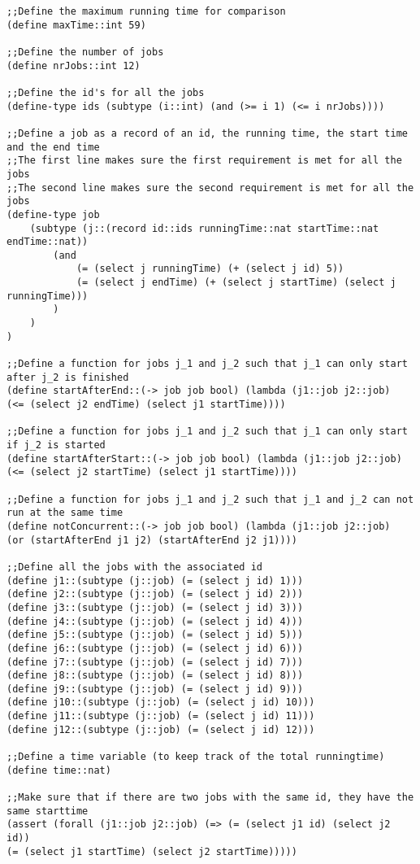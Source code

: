 \documentclass[12pt]{article}
\begin{document}
{\footnotesize
\begin{verbatim}
;;Define the maximum running time for comparison
(define maxTime::int 59)

;;Define the number of jobs
(define nrJobs::int 12)

;;Define the id's for all the jobs
(define-type ids (subtype (i::int) (and (>= i 1) (<= i nrJobs))))

;;Define a job as a record of an id, the running time, the start time and the end time
;;The first line makes sure the first requirement is met for all the jobs
;;The second line makes sure the second requirement is met for all the jobs
(define-type job 
	(subtype (j::(record id::ids runningTime::nat startTime::nat endTime::nat))
		(and 
			(= (select j runningTime) (+ (select j id) 5))
			(= (select j endTime) (+ (select j startTime) (select j runningTime)))
		)
	)
)

;;Define a function for jobs j_1 and j_2 such that j_1 can only start after j_2 is finished
(define startAfterEnd::(-> job job bool) (lambda (j1::job j2::job) 
(<= (select j2 endTime) (select j1 startTime))))

;;Define a function for jobs j_1 and j_2 such that j_1 can only start if j_2 is started
(define startAfterStart::(-> job job bool) (lambda (j1::job j2::job) 
(<= (select j2 startTime) (select j1 startTime))))

;;Define a function for jobs j_1 and j_2 such that j_1 and j_2 can not run at the same time
(define notConcurrent::(-> job job bool) (lambda (j1::job j2::job) 
(or (startAfterEnd j1 j2) (startAfterEnd j2 j1))))

;;Define all the jobs with the associated id
(define j1::(subtype (j::job) (= (select j id) 1)))
(define j2::(subtype (j::job) (= (select j id) 2)))
(define j3::(subtype (j::job) (= (select j id) 3)))
(define j4::(subtype (j::job) (= (select j id) 4)))
(define j5::(subtype (j::job) (= (select j id) 5)))
(define j6::(subtype (j::job) (= (select j id) 6)))
(define j7::(subtype (j::job) (= (select j id) 7)))
(define j8::(subtype (j::job) (= (select j id) 8)))
(define j9::(subtype (j::job) (= (select j id) 9)))
(define j10::(subtype (j::job) (= (select j id) 10)))
(define j11::(subtype (j::job) (= (select j id) 11)))
(define j12::(subtype (j::job) (= (select j id) 12)))

;;Define a time variable (to keep track of the total runningtime)
(define time::nat)

;;Make sure that if there are two jobs with the same id, they have the same starttime
(assert (forall (j1::job j2::job) (=> (= (select j1 id) (select j2 id)) 
(= (select j1 startTime) (select j2 startTime)))))


\end{verbatim}}
\end{document}

